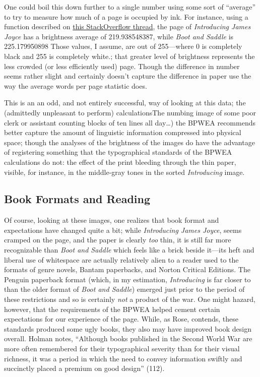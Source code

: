 \documentclass[
  12pt,
]{article}
\begin{document}
One could boil this down further to a single number using some sort of
``average'' to try to measure how much of a page is occupied by ink. For
instance, using a function described on
\href{http://stackoverflow.com/questions/3490727/what-are-some-methods-to-analyze-image-brightness-using-python}{this
StackOverflow thread}, the page of \emph{Introducing James Joyce} has a
brightness average of 219.938548387, while \emph{Boot and Saddle} is
225.179950898 {Those values, I assume, are out of 255---where 0 is
completely black and 255 is completely white.}; that greater level of
brightness represents the less crowded (or less efficiently used) page.
Though the difference in number seems rather slight and certainly
doesn't capture the difference in paper use the way the average words
per page statistic does.

This is an an odd, and not entirely successful, way of looking at this
data; the (admittedly unpleasant to perform) calculations{The numbing
image of some poor clerk or assistant counting blocks of ten lines all
day\ldots{}}) the BPWEA recommends better capture the amount of
linguistic information compressed into physical space; though the
analyses of the brightness of the images do have the advantage of
registering something that the typographical standards of the BPWEA
calculations do not: the effect of the print bleeding through the thin
paper, visible, for instance, in the middle-gray tones in the sorted
\emph{Introducing} image.

\hypertarget{book-formats-and-reading}{%
\subsection{Book Formats and Reading}\label{book-formats-and-reading}}

Of course, looking at these images, one realizes that book format and
expectations have changed quite a bit; while \emph{Introducing James
Joyce}, seems cramped on the page, and the paper is clearly \emph{too}
thin, it is still far more recognizable than \emph{Boot and Saddle}
which feels like a brick beside it---its heft and liberal use of
whitespace are actually relatively alien to a reader used to the formats
of genre novels, Bantam paperbacks, and Norton Critical Editions. The
Penguin paperback format (which, in my estimation, \emph{Introducing} is
far closer to than the older format of \emph{Boot and Saddle}) emerged
just prior to the period of these restrictions and so is certainly
\emph{not} a product of the war. One might hazard, however, that the
requirements of the BPWEA helped cement certain expectations for our
experience of the page. While, as Rose, contends, these standards
produced some ugly books, they also may have improved book design
overall. Holman notes, ``Although books published in the Second World
War are more often remembered for their typographical severity than for
their visual richness, it was a period in which the need to convey
information swiftly and succinctly placed a premium on good design''
(112).
\end{document}

